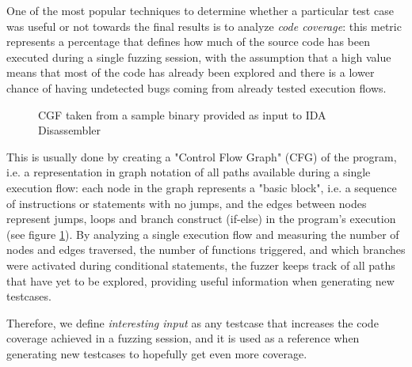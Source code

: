 One of the most popular techniques to determine whether a particular test case was useful or not towards the final results is to analyze \textit{code coverage}: this metric represents a percentage that defines how much of the source code has been executed during a single fuzzing session, with the assumption that a high value means that most of the code has already been explored and there is a lower chance of having undetected bugs coming from already tested execution flows.
\begin{figure}[h]
\caption{CGF taken from a sample binary provided as input to IDA Disassembler \cite{ida}}
\label{fig:cfg}
\end{figure}

\newpage
This is usually done by creating a "Control Flow Graph" (CFG) of the program, i.e. a representation in graph notation of all paths available during a single execution flow: each node in the graph represents a "basic block", i.e. a sequence of instructions or statements with no jumps, and the edges between nodes represent jumps, loops and branch construct (if-else) in the program's execution (see figure \ref{fig:cfg}). By analyzing a single execution flow and measuring the number of nodes and edges traversed, the number of functions triggered, and which branches were activated during conditional statements, the fuzzer keeps track of all paths that have yet to be explored, providing useful information when generating new testcases. 

Therefore, we define \textit{interesting input} as any testcase that increases the code coverage achieved in a fuzzing session, and it is used as a reference when generating new testcases to hopefully get even more coverage.


